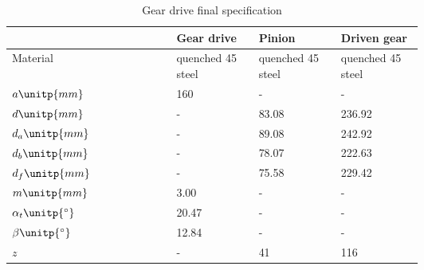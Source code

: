 \begin{table}[ht]
	\centering
	\caption{Gear drive final specification}
	\begin{tabular}{lp{0.2\linewidth}p{0.2\linewidth}p{0.2\linewidth}}\toprule
		& Gear drive & Pinion & Driven gear \\ \midrule
		Material 			&	quenched 45 steel&	quenched 45 steel&	quenched 45 steel\\
		$ a\unitp{mm}    $	&	160	&	-		&	-		\\
		$ d\unitp{mm}    $	&	-		&	83.08	&	236.92	\\
		$ d_a\unitp{mm}  $	&	-		&	89.08	&	242.92	\\
		$ d_b\unitp{mm}  $	&	-		&	78.07	&	222.63	\\
		$ d_f\unitp{mm}  $	&	-		&	75.58	&	229.42	\\
		$ m\unitp{mm}    $	&	3.00	&	-		&	-		\\
		$ \alpha_t\unitp{^\circ}    $	&	20.47	&	-		&	-		\\
		$ \beta\unitp{^\circ}    $	&	12.84	&	-		&	-		\\
		$ z  $	&	-		&	41	&	116	\\
		\bottomrule
	\end{tabular}
\end{table}